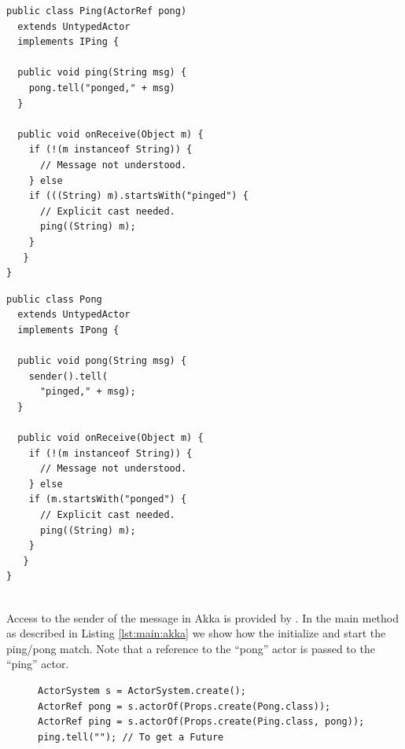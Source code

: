 \lstset{language=Java}
\begin{center}
\begin{minipage}[t]{0.48\textwidth}
\begin{lstlisting}[caption=Ping actor in Akka,label=lst:ping:akka]
public class Ping(ActorRef pong)
  extends UntypedActor 
  implements IPing {

  public void ping(String msg) {
    pong.tell("ponged," + msg)
  }

  public void onReceive(Object m) {
    if (!(m instanceof String)) {
      // Message not understood.
    } else 
    if (((String) m).startsWith("pinged") {
      // Explicit cast needed.
      ping((String) m);
    } 
   }
}
\end{lstlisting}
\end{minipage}
\hfill
\begin{minipage}[t]{0.48\textwidth}
\begin{lstlisting}[caption=Pong class in Akka,label=lst:pong:akka]
public class Pong 
  extends UntypedActor 
  implements IPong {

  public void pong(String msg) {
    sender().tell(
      "pinged," + msg); 
  }

  public void onReceive(Object m) {
    if (!(m instanceof String)) {
      // Message not understood.
    } else 
    if (m.startsWith("ponged") {
      // Explicit cast needed.
      ping((String) m);
    } 
   }
}
 
\end{lstlisting}
\end{minipage}
\end{center}

Access to the sender of the message in Akka is provided by .
In the main method as described in Listing \ref{lst:main:akka} we show how the initialize and start the ping/pong match.
Note that a reference to the ``pong'' actor is passed to the ``ping'' actor.

\begin{figure}[h]
\begin{lstlisting}[caption=main in Akka,label=lst:main:akka]
ActorSystem s = ActorSystem.create();
ActorRef pong = s.actorOf(Props.create(Pong.class));
ActorRef ping = s.actorOf(Props.create(Ping.class, pong));
ping.tell(""); // To get a Future
\end{lstlisting}
\end{figure}

